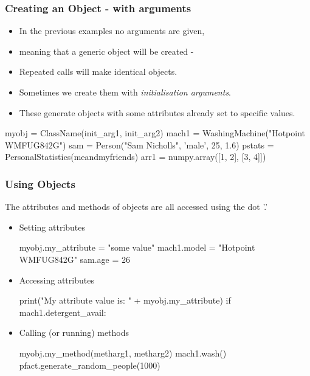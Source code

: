 \documentclass{beamer}
\begin{document}
\begin{frame}[fragile]
\frametitle{Creating an Object - with arguments}

\begin{itemize}
\item In the previous examples no arguments are given,
\item meaning that a generic object will be created -
\item Repeated calls will make identical objects.
\item Sometimes we create them with \emph{initialisation arguments}.
\item These generate objects with some attributes already set to specific values.
\end{itemize}

\begin{code}
myobj = ClassName(init_arg1, init_arg2)
mach1 = WashingMachine("Hotpoint WMFUG842G")
sam = Person("Sam Nicholls", 'male', 25, 1.6)
pstats = PersonalStatistics(meandmyfriends)
arr1 = numpy.array([1, 2], [3, 4]])
\end{code}
\end{frame}

\begin{frame}[fragile]
\frametitle{Using Objects}
The attributes and methods of objects are all accessed using the dot '.'
\begin{itemize}
\item Setting attributes
\begin{code}
myobj.my_attribute = "some value"
mach1.model = "Hotpoint WMFUG842G"
sam.age = 26
\end{code}
\item Accessing attributes
\begin{code}
print("My attribute value is: " + myobj.my_attribute)
if mach1.detergent_avail:
\end{code}
\item Calling (or running) methods
\begin{code}
myobj.my_method(metharg1, metharg2)
mach1.wash()
pfact.generate_random_people(1000)
\end{code}
\end{itemize}
\end{frame}
\end{document}
